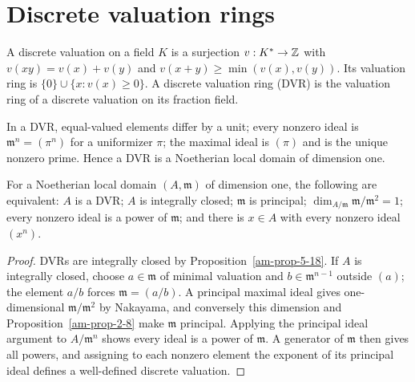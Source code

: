 \section{Discrete valuation rings}
\label{am-ch9-dvr}
\begin{definition}
\label{am-def-discrete-valuation}
\uses{}
A discrete valuation on a field $K$ is a surjection $v:K^*\to\mathbb Z$ with
$v(xy)=v(x)+v(y)$ and $v(x+y)\ge\min(v(x),v(y))$.  Its valuation ring is
$\{0\}\cup\{x:v(x)\ge0\}$.  A discrete valuation ring (DVR) is the valuation
ring of a discrete valuation on its fraction field.
\end{definition}
\begin{remark}
\label{am-rem-dvr-ideals}
\uses{}
In a DVR, equal-valued elements differ by a unit; every nonzero ideal is
$\mathfrak{m}^n=(\pi^n)$ for a uniformizer $\pi$; the maximal ideal is
$(\pi)$ and is the unique nonzero prime.  Hence a DVR is a Noetherian local
domain of dimension one.
\end{remark}
\begin{proposition}
\label{am-prop-9-2}
\uses{}
For a Noetherian local domain $(A,\mathfrak{m})$ of dimension one, the following are
equivalent: $A$ is a DVR; $A$ is integrally closed; $\mathfrak{m}$ is principal;
$\dim_{A/\mathfrak{m}}\mathfrak{m}/\mathfrak{m}^2=1$; every nonzero ideal is a power of $\mathfrak{m}$; and there is
$x\in A$ with every nonzero ideal $(x^n)$.
\end{proposition}
\begin{proof}
DVRs are integrally closed by Proposition~\ref{am-prop-5-18}.  If $A$ is
integrally closed, choose $a\in\mathfrak{m}$ of minimal valuation and $b\in\mathfrak{m}^{n-1}$
outside $(a)$; the element $a/b$ forces $\mathfrak{m}=(a/b)$.  A principal maximal ideal
gives one-dimensional $\mathfrak{m}/\mathfrak{m}^2$ by Nakayama, and conversely this dimension
and Proposition~\ref{am-prop-2-8} make $\mathfrak{m}$ principal.  Applying the principal
ideal argument to $A/\mathfrak{m}^n$ shows every ideal is a power of $\mathfrak{m}$.  A generator
of $\mathfrak{m}$ then gives all powers, and assigning to each nonzero element the
exponent of its principal ideal defines a well-defined discrete valuation.
\end{proof}

